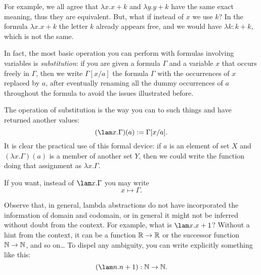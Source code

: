For example, we all agree that \(\lambda x . x+k\) and \(\lambda y . y+k\) have the same exact meaning, thus they are equivalent. But, what if instead of \(x\) we use \(k\)? In the formula \(\lambda x . x+k\) the letter \(k\) already appears free, and we would have \(\lambda k : k+k\), which is not the same.

In fact, the most basic operation you can perform with formulas involving variables is {\em substitution}: if you are given a formula \(\Gamma\) and a variable \(x\) that occurs freely in \(\Gamma\), then we write \(\Gamma[x/a]\) the formula \(\Gamma\) with the occurrences of \(x\) replaced by \(a\), after eventually renaming all the dummy occurrences of \(a\) throughout the formula to avoid the issues illustrated before.

The operation of substitution is the way you can  to such things and have returned another values:
\[(\lam x . \Gamma) (a) := \Gamma[x/a] .\]
It is clear the practical use of this formal device: if \(a\) is an element of set \(X\) and \(\left( \lambda x . \Gamma \right)(a)\) is a member of another set \(Y\), then we could write the function doing that assignment as \(\lambda x . \Gamma\).

If you want, instead of \(\lam x . \Gamma\) you may write
\[x \mapsto \Gamma .\]

Observe that, in general, lambda abstractions do not have incorporated the information of domain and codomain, or in general it might not be inferred without doubt from the context. For example, what is \(\lam x . x+1\)? Without a hint from the context, it can be a function \(\mathbb R \to \mathbb R\) or the successor function \(\mathbb N \to \mathbb N\), and so on\dots{} To dispel any ambiguity, you can write explicitly something like this:
\[(\lam n . n+1) : \naturals \to \naturals .\]
